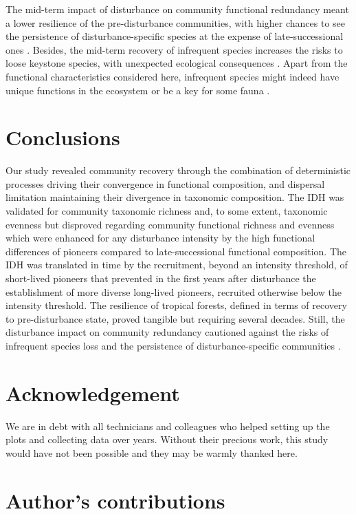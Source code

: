 \documentclass[fleqn,10pt]{ArtEcoFoG} %
\begin{document}
The mid-term impact of disturbance on community functional redundancy
meant a lower resilience of the pre-disturbance communities, with higher
chances to see the persistence of disturbance-specific species at the
expense of late-successional ones \citep{Haddad2008}. Besides, the
mid-term recovery of infrequent species increases the risks to loose
keystone species, with unexpected ecological consequences
\citep{Jones1994, Chazdon2003a, Diaz2005}. Apart from the functional
characteristics considered here, infrequent species might indeed have
unique functions in the ecosystem or be a key for some fauna
\citep{Schleuning2016}.

\section{Conclusions}\label{conclusions}

Our study revealed community recovery through the combination of
deterministic processes driving their convergence in functional
composition, and dispersal limitation maintaining their divergence in
taxonomic composition. The IDH was validated for community taxonomic
richness and, to some extent, taxonomic evenness but disproved regarding
community functional richness and evenness which were enhanced for any
disturbance intensity by the high functional differences of pioneers
compared to late-successional functional composition. The IDH was
translated in time by the recruitment, beyond an intensity threshold, of
short-lived pioneers that prevented in the first years after disturbance
the establishment of more diverse long-lived pioneers, recruited
otherwise below the intensity threshold. The resilience of tropical
forests, defined in terms of recovery to pre-disturbance state, proved
tangible but requiring several decades. Still, the disturbance impact on
community redundancy cautioned against the risks of infrequent species
loss and the persistence of disturbance-specific communities
\citep{Herault2018}.

\section{Acknowledgement}\label{acknowledgement}

We are in debt with all technicians and colleagues who helped setting up
the plots and collecting data over years. Without their precious work,
this study would have not been possible and they may be warmly thanked
here.

\section{Author's contributions}\label{authors-contributions}
\end{document}
